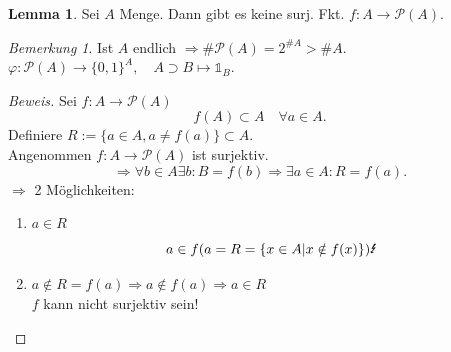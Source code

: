 \documentclass[12pt,a4paper,titlepage]{article} %
\theoremstyle{definition}
\newtheorem{lem}[satz]{Lemma}
\theoremstyle{remark}
\newtheorem*{bem}{Bemerkung}
\newenvironment{bew}{\begin{proof}[Beweis]}{\end{proof}}
\begin{document}
\begin{lem}
	Sei \(A\) Menge. Dann gibt es keine surj. Fkt. \(f: A\rightarrow \mathcal{P}(A) \).
\end{lem}
\begin{bem}
	Ist \(A\) endlich \( \Rightarrow \# \mathcal{P} (A) = 2^{\# A} > \#A \).\\
	\( \varphi: \mathcal{P}(A) \rightarrow \{0,1\}^A, \quad A\supset B \mapsto \mathds{1}_B \).
\end{bem}
\begin{bew}
	Sei \(f: A \rightarrow \mathcal{P}(A) \)
	\[ f(A) \subset A \quad \forall a \in A. \]
	Definiere \(R := \{a\in A, a \neq f(a)\} \subset A \).\\
	Angenommen \(f: A \rightarrow \mathcal{P}(A) \) ist surjektiv.
	\[ \Rightarrow \forall b\in A \exists b : B=f(b) \Rightarrow \exists a\in A : R = f(a). \]
	\(\Rightarrow\) 2 Möglichkeiten:
	\begin{enumerate}
		\item \(a\in R\) \[ a\in f(a = R = \{x\in A| x\notin f(x)\}) \text{\Lightning} \]
		\item \(a \notin R = f(a) \Rightarrow a \notin f(a) \Rightarrow a\in R \) \Lightning\\
		\( f\) kann nicht surjektiv sein!
	\end{enumerate}
\end{bew}


\newpage
\section{}
\end{document}
